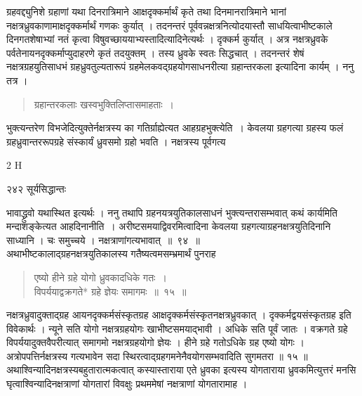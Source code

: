 \documentclass[11pt, openany]{book}
\begin{document}
 ग्रहवद्द्युनिशे ग्रहाणां यथा दिनरात्रिमाने आक्षदृक्कर्मार्थं कृते तथा दिनमानरात्रिमाने भानां नक्षत्रध्रुवकाणामाक्षदृक्कर्मार्थं गणकः कुर्यात् । तदनन्तरं पूर्ववन्नक्षत्रनित्योदयास्तौ साधयित्वाभीष्टकाले दिनगतशेषाभ्यां नतं कृत्वा विषुवच्छाययाभ्यस्तादित्यादिनेत्यर्थः । दृक्कर्म कुर्यात् । अत्र नक्षत्रध्रुवके पर्वतेनायनदृक्कर्माप्युदाहरणे कृतं तदयुक्तम् । तस्य ध्रुवके स्वतः सिद्धचात् । तदनन्तरं शेषं नक्षत्रग्रहयुतिसाधभं ग्रहध्रुवतुल्यतारूपं ग्रहमेलकवद्ग्रहयोगसाधनरीत्या ग्रहान्तरकला इत्यादिना कार्यम् । ननु तत्र ।


\begin{quote}
{\qt ग्रहान्तरकलाः खस्वभुक्तिलिप्तासमाहताः~।}\\
\end{quote}

भुक्त्यन्तरेण विभजेदित्युक्तेर्नक्षत्रस्य का गतिर्ग्राह्येत्यत आह\textendash  ग्रहभुक्त्येति~। केवलया ग्रहगत्या ग्रहस्य फलं ग्रहध्रुवान्तररूपग्रहे संस्कार्यं ध्रुवसमो ग्रहो भवति । नक्षत्रस्य पूर्वगत्य \textendash

{\tiny{2 H}}

\newpage


\noindent २४२ \hspace{4cm} सूर्यसिद्धान्तः 
\vspace{1cm}


\noindent भावाद्ध्रुवो यथास्थित इत्यर्थः । ननु तथापि ग्रहनयत्रयुतिकालसाधनं भुक्त्यन्तरासम्भवात् कथं कार्यमिति मन्दाशङ्केत्यत आह\textendash दिनानीति~। अरीष्टसमयाद्विवरमित्वादिना केवलया ग्रहगत्याग्रहनक्षत्रयुतिदिनानि साध्यानि । चः समुच्चये । नक्षत्राणांगत्यभावात्~॥~९४~॥\\
\noindent अथाभीष्टकालाद्ग्रहनक्षत्रयुतिकालस्य गतैष्यत्वमसम्भ्रमार्थं पुनराह \textendash


\begin{quote}
{\ssi एष्यो हीने ग्रहे योगो ध्रुवकादधिके गतः~।\\
 विपर्ययाद्वक्रगते* ग्रहे ज्ञेयः समागमः~॥~१५~॥ }
\end{quote}

 नक्षत्रध्रुवादुक्ताद्ग्रह आयनदृक्कर्मसंस्कृतग्रह आक्षदृक्कर्मसंस्कृतनक्षत्रध्रुवकात् । दृक्कर्मद्वयसंस्कृतग्रह इति विवेकार्थः । न्यूने सति योगो नक्षत्रग्रहयोगः खाभीष्टसमयाद्भावी । अधिके सति पूर्वं जातः । वक्रगते ग्रहे विपर्ययादुक्तवैपरीत्यात् समागमो नक्षत्रग्रहयोगो ज्ञेयः । हीने ग्रहे गतोऽधिके ग्रह एष्यो योगः ।अत्रोपपत्तिर्नक्षत्रस्य गत्यभावेन सदा स्थिरत्वाद्ग्रहगमनेनैवयोगसम्भवादिति सुगमतरा ॥ १५ ॥ अथाश्विन्यादिनक्षत्रस्यबहुतारात्मकत्वात् कस्यास्ताराया एते ध्रुवका इत्यस्य योगताराया ध्रुवकमित्युत्तरं मनसि घृत्वाश्विन्यादिनक्षत्राणां योगतारां विवक्षुः प्रथममेषां नक्षत्राणां योगतारामाह । 
\end{document}
